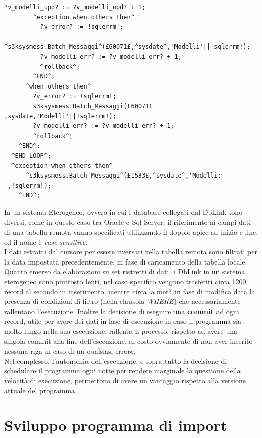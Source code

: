 \begin{lstlisting}[frame=single, style=base]
           ?v_modelli_upd? := ?v_modelli_upd? + 1;
        ^exception when others then^
          ?v_error? := !sqlerrm!;
          ^s3ksysmess.Batch_Messaggi^(£60071£,^sysdate^,'Modelli'||!sqlerrm!);
          ?v_modelli_err? := ?v_modelli_err? + 1;
          ^rollback^;
        ^END^;
      ^when others then^
        ?v_error? := !sqlerrm!;
        s3ksysmess.Batch_Messaggi(£60071£ ,sysdate,'Modelli'||!sqlerrm!);
        ?v_modelli_err? := ?v_modelli_err? + 1;
        ^rollback^;
    ^END^;
  ^END LOOP^;
  ^exception when others then^
      ^s3ksysmess.Batch_Messaggi^(£1583£,^sysdate^,'Modelli: ',!sqlerrm!);
    ^END^;
\end{lstlisting}
In un sistema Eterogeneo, ovvero in cui i database collegati dal DbLink sono diversi, come in questo caso tra Oracle e Sql Server, il riferimento ai campi dati di una tabella remota vanno specificati utilizzando il doppio apice ad inizio e fine, ed il nome è \textit{case sensitive}.\\
I dati estratti dal cursore per essere riversati nella tabella remota sono filtrati per la data impostata precedentemente, in fase di caricamento della tabella locale.
Quanto emerso da elaborazioni su set ristretti di dati, i DbLink in un sistema eterogeneo sono piuttosto lenti, nel caso specifico vengono trasferiti circa 1200 record al secondo in inserimento, mentre circa la metà in fase di modifica data la presenza di condizioni di filtro (nella clausola \textit{WHERE}) che necessariamente rallentano l'esecuzione. Inoltre la decisione di eseguire una \textbf{commit} ad ogni record, utile per avere dei dati in fase di esecuzione in caso il programma sia molto lungo nella sua esecuzione, rallenta il processo, rispetto ad avere una singola commit alla fine dell'esecuzione, al costo ovviamente di non aver inserito nessuna riga in caso di un qualsiasi errore.\\
Nel complesso, l'autonomia dell'esecuzione, e soprattutto la decisione di schedulare il programma ogni notte per rendere marginale la questione della velocità di esecuzione, permettono di avere un vantaggio rispetto alla versione attuale del programma.
\newpage
\section{Sviluppo programma di import}
